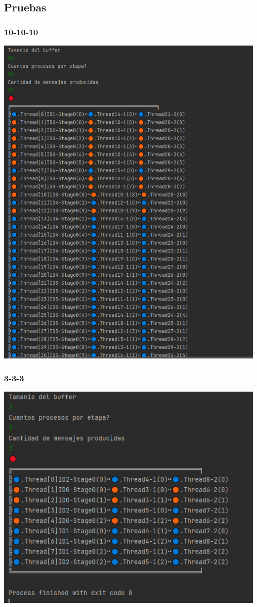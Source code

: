 \documentclass[a4paper]{article}
\begin{document}
    \subsection{Pruebas}

    \subsubsection{10-10-10}
    \includegraphics{10-10-10.PNG}

    \subsubsection{3-3-3}
    \includegraphics{3-3-3.PNG}
\end{document}
